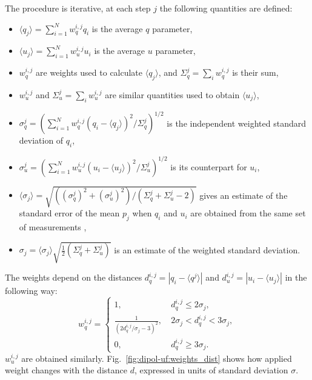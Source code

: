 The procedure is iterative, at each step $j$ the following quantities are defined:
\begin{itemize}
    \item $ \langle q_j \rangle  = \sum_{i = 1}^N w_q^{i,j} q_i$ is the average $q$ parameter,
    \item $ \langle u_j \rangle  = \sum_{i = 1}^N w_u^{i,j} u_i$ is the average $u$ parameter,
    \item $w_q^{i,j}$ are weights used to calculate $ \langle q_j \rangle $, and $\Sigma_q^j = \sum_i w_q^{i,j}$ is their sum,
    \item $w_u^{i,j}$ and $\Sigma_u^j = \sum_i w_u^{i,j}$ are similar quantities used to obtain $ \langle u_j \rangle $,
    \item $\sigma_q^j = \left(\sum_{i = 1}^N w_q^{i,j} \left(q_i -  \langle q_j \rangle \right)^2 / \Sigma_q^j \right)^{1/2}$ is the independent weighted standard deviation of $q_i$,
    \item $\sigma_u^j = \left(\sum_{i = 1}^N w_u^{i,j} \left(u_i -  \langle u_j \rangle \right)^2 / \Sigma_u^j \right)^{1/2}$ is its counterpart for $u_i$,
    \item $ \langle \sigma_j \rangle  = \sqrt{\left(\left(\sigma_q^j\right)^2 + \left(\sigma_u^j\right)^2\right)/ \left(\Sigma_q^j + \Sigma_u^j - 2\right)}$ gives an estimate of the standard error of the mean $p_j$ when $q_i$ and $u_i$ are obtained from the same set of measurements \citep{Serkowski1962},
    \item $\sigma_j =  \langle \sigma_j \rangle \sqrt{\frac{1}{2}\left(\Sigma_q^j + \Sigma_u^j\right)}$ is an estimate of the weighted standard deviation.
\end{itemize}
The weights depend on the distances $d_q^{i, j} = \left|q_i -  \langle q^j \rangle \right|$ and $d_u^{i, j} = \left|u_i -  \langle u_j \rangle \right|$ in the following way:
\begin{equation}
    w_q^{i,j} = 
    \begin{cases}
        1,&~d_q^{i, j} \le 2 \sigma_j, \\
        \frac{1}{\left(2 d_q^{i, j} / \sigma_j - 3\right)^2},&~ 2\sigma_j < d_q^{i, j} < 3\sigma_j, \\
        0,&~d_q^{i,j} \ge 3\sigma_j.
    \end{cases}
\end{equation}
$w_u^{i, j}$ are obtained similarly.
Fig.~\ref{fig:dipol-uf:weights_dist} shows how applied weight changes with the distance $d$, expressed in units of standard deviation $\sigma$.

